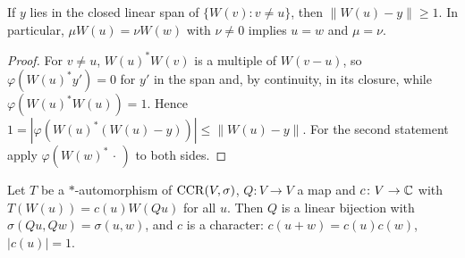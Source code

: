 \noindent{}

\begin{lemma}[Separation]\label{lem:separation}
If $y$ lies in the closed linear span of $\{W(v):v\neq u\}$, then $\|W(u)-y\|\ge1$. In particular,
$\mu W(u)=\nu W(w)$ with $\nu\neq0$ implies $u=w$ and $\mu=\nu$.
\end{lemma}

\begin{proof}
For $v\neq u$, $W(u)^*W(v)$ is a multiple of $W(v-u)$, so $\varphi(W(u)^*y')=0$ for $y'$ in the span and,
by continuity, in its closure, while $\varphi(W(u)^*W(u))=1$. Hence
$1=|\varphi(W(u)^*(W(u)-y))|\le\|W(u)-y\|$. For the second statement apply $\varphi(W(w)^*\,\cdot\,)$ to
both sides.
\end{proof}

\begin{theorem}\label{thm:weyl-type}
Let $T$ be a $*$-automorphism of $\operatorname{CCR}(V,\sigma)$, $Q\colon V\to V$ a map and $c\colon V\to\mathbb C$ with
$T(W(u))=c(u)W(Q u)$ for all $u$. Then $Q$ is a linear bijection with
$\sigma(Q u,Q w)=\sigma(u,w)$, and $c$ is a character: $c(u+w)=c(u)c(w)$, $|c(u)|=1$.
\end{theorem}

